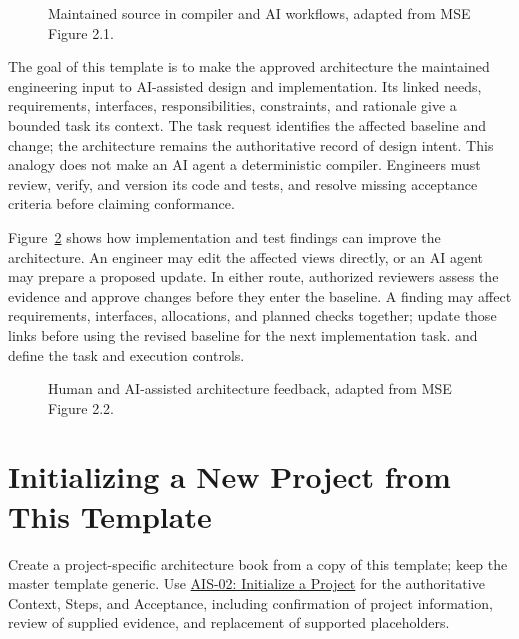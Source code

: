 \begin{figure}[htbp]
\centering
\resizebox{\textwidth}{!}{}
\caption{Maintained source in compiler and AI workflows, adapted from MSE Figure 2.1.}
\label{Figure:MaintainedSourceComparison}
\end{figure}

The goal of this template is to make the approved architecture the maintained
engineering input to AI-assisted design and implementation. Its linked needs,
requirements, interfaces, responsibilities, constraints, and rationale give a
bounded task its context. The task request identifies the affected baseline and
change; the architecture remains the authoritative record of design intent.
This analogy does not make an AI agent a deterministic compiler. Engineers must
review, verify, and version its code and tests, and resolve missing acceptance
criteria before claiming conformance.

Figure~\ref{Figure:ArchitectureUpdateFeedback} shows how implementation and
test findings can improve the architecture. An engineer may edit the affected
views directly, or an AI agent may prepare a proposed update. In either route,
authorized reviewers assess the evidence and approve changes before they enter
the baseline. A finding may affect requirements, interfaces, allocations, and
planned checks together; update those links before using the revised baseline
for the next implementation task.  and
 define the task and execution controls.

\begin{figure}[htbp]
\centering
\resizebox{\textwidth}{!}{}
\caption{Human and AI-assisted architecture feedback, adapted from MSE Figure 2.2.}
\label{Figure:ArchitectureUpdateFeedback}
\end{figure}

\section{Initializing a New Project from This Template}
\label{Section:InitializeNewProject}
Create a project-specific architecture book from a copy of this template;
keep the master template generic. Use
\hyperref[Skill:AIS-02]{AIS-02: Initialize a Project} for the authoritative
Context, Steps, and Acceptance, including confirmation of project information,
review of supplied evidence, and replacement of supported placeholders.


